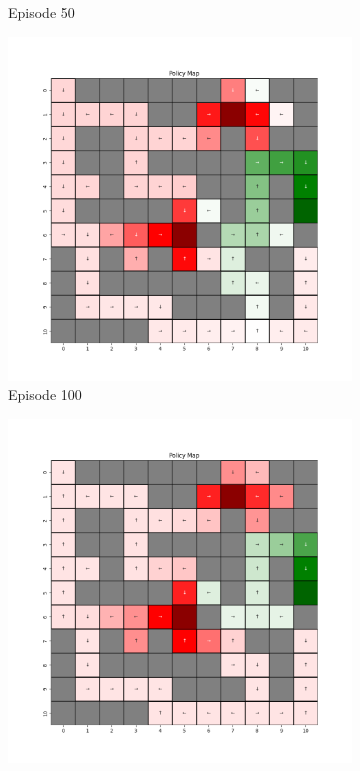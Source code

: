 \documentclass{assignment}
\begin{document}
\begin{figure}[H]
\begin{subfigure}{0.3\textwidth}
    \caption{Episode 50}
    \end{subfigure}\hfill
    \begin{subfigure}{0.3\textwidth}
        \includegraphics[width=\textwidth]{figures/policy_td/alpha_sweep/policy_alpha_0.5_gamma_0.95_epsilon_0.2_iteration_100.png}
    \caption{Episode 100}
    \end{subfigure}
    \begin{subfigure}{0.3\textwidth}
        \includegraphics[width=\textwidth]{figures/policy_td/alpha_sweep/policy_alpha_0.5_gamma_0.95_epsilon_0.2_iteration_1000.png}

\end{subfigure}
\end{figure}
\end{document}
